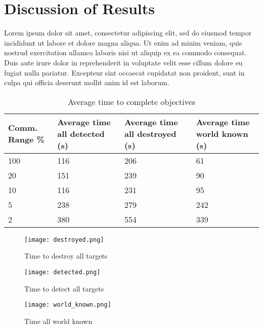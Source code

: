 \chapter{Discussion of Results}
Lorem ipsum dolor sit amet, consectetur adipiscing elit, sed do eiusmod tempor incididunt ut labore et dolore magna aliqua. Ut enim ad minim veniam, quis nostrud exercitation ullamco laboris nisi ut aliquip ex ea commodo consequat. Duis aute irure dolor in reprehenderit in voluptate velit esse cillum dolore eu fugiat nulla pariatur. Excepteur sint occaecat cupidatat non proident, sunt in culpa qui officia deserunt mollit anim id est laborum.



\begin{table}[h]
	\caption{Average time to complete objectives}
	\centering
	\label{tab:avgResults}
		\begin{tabular}{|p{1.25cm}|p{1.5cm}|p{1.75cm}|p{1.5cm}|}
		\hline
		Comm. Range \% & Average time all detected (s) & Average time all destroyed (s) & Average time world known (s)\\
		\hline
			100 & 116 & 206 & 61  \\ \hline
			 20 & 151 & 239 & 90  \\ \hline
			 10 & 116 & 231 & 95  \\ \hline
			  5 & 238 & 279 & 242 \\ \hline
			  2 & 380 & 554 & 339 \\ \hline
	\end{tabular}
\end{table}

\begin{figure}[h]
	\centering
	\texttt{[image: destroyed.png]}
	\caption{Time to destroy all targets}
	\label{fig:time_to_destroy}
\end{figure}

\begin{figure}[h]
	\centering
	\texttt{[image: detected.png]}
	\caption{Time to detect all targets}
	\label{fig:time_to_detect}
\end{figure}

\begin{figure}[h]
	\centering
	\texttt{[image: world\_known.png]}
	\caption{Time all world known}
	\label{fig:time_all_world_known}
\end{figure}
